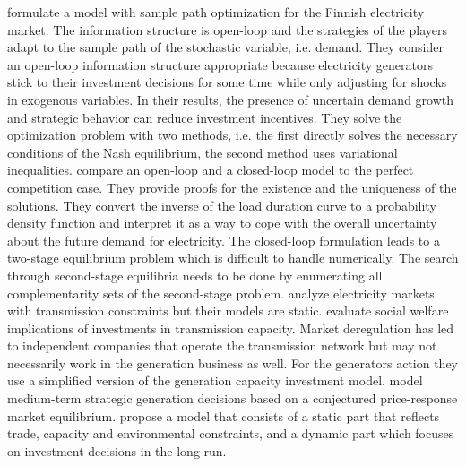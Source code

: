 \cite{Pineau2003} formulate a model with sample path optimization for the Finnish electricity market. The information structure is open-loop and the strategies of the players adapt to the sample path of the stochastic variable, i.e. demand. They consider an open-loop information structure appropriate because electricity generators stick to their investment decisions for some time while only adjusting for shocks in exogenous variables. In their results, the presence of uncertain demand growth and strategic behavior can reduce investment incentives. They solve the optimization problem with two methods, i.e. the first directly solves the necessary conditions of the Nash equilibrium, the second method uses variational inequalities. \cite{Murphy2005} compare an open-loop and a closed-loop model to the perfect competition case. They provide proofs for the existence and the uniqueness of the solutions. They convert the inverse of the load duration curve to a probability density function and interpret it as a way to cope with the overall uncertainty about the future demand for electricity. The closed-loop formulation leads to a two-stage equilibrium problem which is difficult to handle numerically. The search through second-stage equilibria needs to be done by enumerating all complementarity sets of the second-stage problem.
\cite{Neuhoff2005} analyze electricity markets with transmission constraints but their models are static. \cite{Sauma2006} evaluate social welfare implications of investments in transmission capacity. Market deregulation has led to independent companies that operate the transmission network but may not necessarily work in the generation business as well. For the generators action they use a simplified version of the \cite{Murphy2005} generation capacity investment model. \cite{Centeno2007} model medium-term strategic generation decisions based on a conjectured price-response market equilibrium. \cite{Lise2008} propose a model that consists of a static part that reflects trade, capacity and environmental constraints, and a dynamic part which focuses on investment decisions in the long run. 

